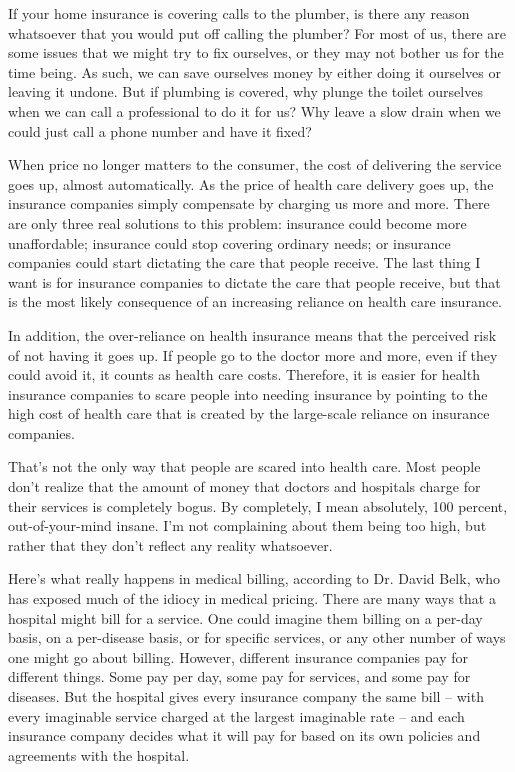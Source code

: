 If your home insurance is covering calls to the plumber, is there any
reason whatsoever
that you would put off calling the plumber?  For most of us, there are
some issues that we might try to fix ourselves, or they may not bother
us for the time being. As such, we can save ourselves money by either
doing it ourselves or leaving it undone.
But if plumbing is
covered, why plunge the toilet ourselves when we can call a
professional to do it for us?  Why leave a slow drain when we could
just call a phone number and have it fixed? 

When price no longer matters to the consumer, the cost of delivering the
service goes up, almost automatically. As the price of health care
delivery goes up, the insurance companies simply compensate by charging
us more and more. There are only three real solutions to this problem:
insurance could become more unaffordable; insurance could stop covering
ordinary needs; or insurance companies could start dictating the care
that people receive. The last thing I want is for insurance companies
to dictate the care that people receive, but that is the most likely
consequence of an increasing reliance on health care insurance.

In addition, the over-reliance on health insurance means that the
perceived risk of not having it goes up. If people go to the doctor
more and more, even if they could avoid it, it counts as health care
costs. Therefore, it is easier for health insurance companies to scare
people into needing insurance by pointing to the high cost of health
care that is created by the large-scale reliance on insurance
companies. 

That's not the only way that people are scared into
health care. Most people don't realize that the amount
of money that doctors and hospitals charge for their services is
completely bogus. By completely, I mean absolutely, 100 percent,
out-of-your-mind insane. I'm not complaining about
them being too high, but rather that they don't
reflect any reality whatsoever. 

Here's what really happens in medical billing,
according to Dr. David Belk, who has exposed much of the idiocy in
medical pricing. There are many ways that a hospital might bill for a
service. One could imagine them billing on a per-day basis, on a
per-disease basis, or for specific services, or any
other number of ways
one might go about billing. However, different insurance companies pay
for different things. Some pay per day, some pay for services, and some
pay for diseases.  But the hospital gives every insurance company the
same bill – with every imaginable service charged at the largest
imaginable rate – and each insurance company decides what it will pay
for based on its own policies and agreements with the hospital.

